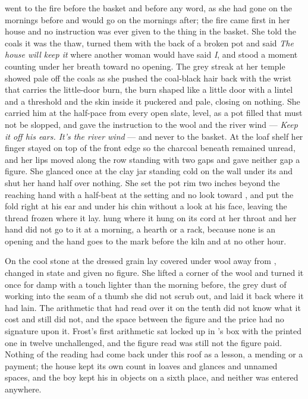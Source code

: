  went to the fire before the basket and before any word, as she had gone on the mornings before and would go on the mornings after; the fire came first in her house and no instruction was ever given to the thing in the basket. She told the coals it was the thaw, turned them with the back of a broken pot and said \emph{The house will keep it} where another woman would have said \emph{I}, and stood a moment counting under her breath toward no opening. The grey streak at her temple showed pale off the coals as she pushed the coal-black hair back with the wrist that carries the little-door burn, the burn shaped like a little door with a lintel and a threshold and the skin inside it puckered and pale, closing on nothing. She carried him at the half-pace from every open slate, level, as a pot filled that must not be slopped, and gave the instruction to the wool and the river wind --- \emph{Keep it off his ears. It's the river wind} --- and never to the basket. At the loaf shelf her finger stayed on top of the front edge so the charcoal beneath remained unread, and her lips moved along the row standing with two gaps and gave neither gap a figure. She glanced once at the clay jar standing cold on the wall under its  and shut her hand half over nothing. She set the pot rim two inches beyond the reaching hand with a half-beat at the setting and no look toward , and put the fold right at his ear and under his chin without a look at his face, leaving the thread frozen where it lay.  hung where it hung on its cord at her throat and her hand did not go to it at a morning, a hearth or a rack, because none is an opening and the hand goes to the mark before the kiln and at no other hour.

On the cool stone at  the dressed grain lay covered under wool away from , changed in state and given no figure. She lifted a corner of the wool and turned it once for damp with a touch lighter than the morning before, the grey dust of  working into the seam of a thumb she did not scrub out, and laid it back where it had lain. The arithmetic that had read over it on the tenth did not know what it cost and still did not, and the space between the figure and the price had no signature upon it. Frost's first arithmetic sat locked up  in 's box with the printed one in twelve unchallenged, and the figure read was still not the figure paid. Nothing of the reading had come back under this roof as a lesson, a mending or a payment; the house kept its own count in loaves and glances and unnamed spaces, and the boy kept his in objects on a sixth place, and neither was entered anywhere.


